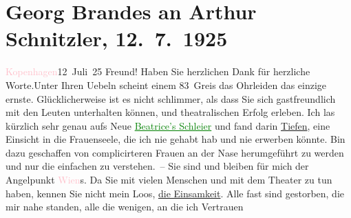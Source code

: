

               \section[Georg Brandes an Arthur Schnitzler, 12. 7. 1925]{ Georg Brandes an Arthur Schnitzler, 12. 7. 1925}\nopagebreak{}\rehead{ }\normalsize\beginnumbering{} \toendnotes[C]{\smallbreak\pagebreak[2]} 
\toendnotes[C]{\smallbreak}\pstart
           \raggedleft{}{\pb}\textcolor{pink}{Kopenhagen}{}\ledrightnote{\textcolor{pink}{Kopenhagen}}{ }12 Juli 25\pend
           \pstart
           Freund! Haben Sie herzlichen Dank für herzliche Worte.\hspace*{2em}Unter Ihren Uebeln scheint einem 83 Greis das Ohrleiden
               das einzige ernste. Glücklicherweise ist es nicht schlimmer, als dass Sie sich
               gastfreundlich mit den Leuten unterhalten können, und theatralischen Erfolg erleben.
               Ich las kürzlich sehr genau aufs Neue \textcolor{green}{\uline{Beatrice’s Schleier}}{}\ledrightnote{\textcolor{green}{Der Schleier der Beatrice. Schauspiel in fünf Akten}} und fand darin \uline{Tiefen}, eine Einsicht in die
               Frauenseele, die ich nie gehabt hab und nie erwerben könnte. Bin dazu geschaffen von
               complicirteren Frauen an der Nase herumgeführt zu werden und nur die einfachen zu
               verstehen. – Sie sind und bleiben für mich der Angelpunkt \textcolor{pink}{Wien}{}\ledrightnote{\textcolor{pink}{Wien}}s. Da Sie mit vielen Menschen und mit dem Theater zu tun haben, kennen
               Sie nicht mein Loos, \uline{die Einsamkeit}. Alle fast sind
               gestorben, die mir nahe standen, alle {\pb}die wenigen, an die ich Vertrauen
